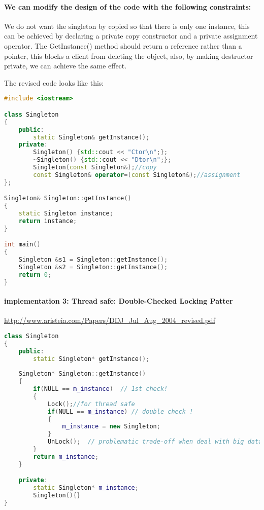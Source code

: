 \documentclass{book}
\begin{document}
\paragraph{We can modify the design of the code with the following constraints:}

    We do not want the singleton by copied so that there is only one instance, this can be achieved by declaring a private copy constructor and a private assignment operator.
    The GetInstance() method should return a reference rather than a pointer, this blocks a client from deleting the object, also, by making destructor private, we can achieve the same effect.

The revised code looks like this:

\begin{lstlisting}[caption={sample code 1.2: revised},language=C++]
#include <iostream>

class Singleton
{
    public:
    	static Singleton& getInstance(); 
    private:
    	Singleton() {std::cout << "Ctor\n";};
    	~Singleton() {std::cout << "Dtor\n";};
    	Singleton(const Singleton&);//copy 
    	const Singleton& operator=(const Singleton&);//assignment
};

Singleton& Singleton::getInstance() 
{
	static Singleton instance;
	return instance;
}

int main()
{
	Singleton &s1 = Singleton::getInstance();
	Singleton &s2 = Singleton::getInstance();
	return 0;
}
\end{lstlisting}

\paragraph{implementation 3: Thread safe: Double-Checked Locking Patter}\label{DCLP}
\url{http://www.aristeia.com/Papers/DDJ\_Jul\_Aug\_2004\_revised.pdf}
\begin{lstlisting}[caption={sample code 3: thread safe},language=C++]
class Singleton  
{  
    public:  
        static Singleton* getInstance();  
      
    Singleton* Singleton::getInstance()  
    {  
        if(NULL == m_instance)  // 1st check!
        {  
            Lock();//for thread safe  
            if(NULL == m_instance) // double check !
            {  
                m_instance = new Singleton;  
            }  
            UnLock();  // problematic trade-off when deal with big data.
        }  
        return m_instance;  
    }

    private:  
        static Singleton* m_instance;  
        Singleton(){}  
}  
\end{lstlisting}
\end{document}
